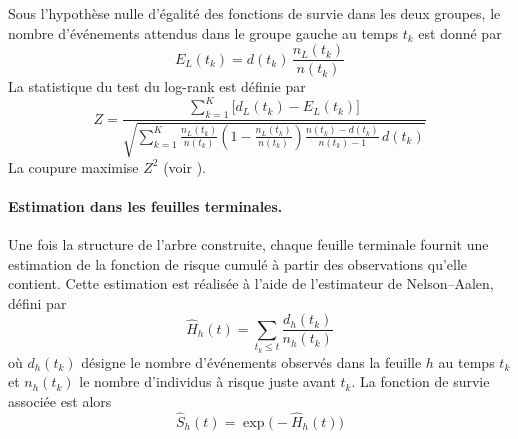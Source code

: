 \documentclass[12pt,a4paper]{article}
\begin{document}
\begin{enumerate}
Sous l’hypothèse nulle d’égalité des fonctions de survie dans les deux groupes, le nombre d’événements attendus dans le groupe gauche au temps $t_k$ est donné par
\begin{equation}
E_L(t_k) = d(t_k)\,\frac{n_L(t_k)}{n(t_k)}
\end{equation}
La statistique du test du log-rank est définie par
\begin{equation}
Z = \frac{\sum_{k=1}^K \bigl[d_L(t_k) - E_L(t_k)\bigr]}{\sqrt{\sum_{k=1}^K \frac{n_L(t_k)}{n(t_k)} \left(1 - \frac{n_L(t_k)}{n(t_k)}\right) \frac{n(t_k)-d(t_k)}{n(t_k)-1} \, d(t_k)}}
\end{equation}
La coupure maximise $Z^2$ (voir \cite{scikit-rsf}).
\paragraph{Estimation dans les feuilles terminales.}
Une fois la structure de l’arbre construite, chaque feuille terminale fournit une estimation de la fonction de risque cumulé à partir des observations qu’elle contient. Cette estimation est réalisée à l’aide de l’estimateur de Nelson--Aalen, défini par
\begin{equation}
\hat H_h(t) = \sum_{t_k \le t} \frac{d_h(t_k)}{n_h(t_k)}
\end{equation}
où $d_h(t_k)$ désigne le nombre d’événements observés dans la feuille $h$ au temps $t_k$ et $n_h(t_k)$ le nombre d’individus à risque juste avant $t_k$. La fonction de survie associée est alors
\begin{equation}
\hat S_h(t) = \exp\bigl(-\hat H_h(t)\bigr)
\end{equation}


\end{enumerate}
\end{document}
